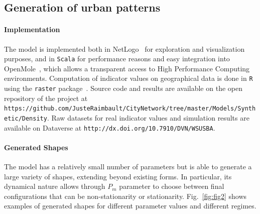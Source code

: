 \documentclass[10pt,letterpaper,draft]{article}
\begin{document}
\subsection*{Generation of urban patterns}


\paragraph{Implementation}


The model is implemented both in NetLogo~\cite{wilensky1999netlogo} for exploration and visualization purposes, and in \texttt{Scala} for performance reasons and easy integration into OpenMole~\cite{reuillon2013openmole}, which allows a transparent access to High Performance Computing environments. Computation of indicator values on geographical data is done in \texttt{R} using the \texttt{raster} package~\cite{hijmans2015geographic}. Source code and results are available on the open repository of the project at \texttt{https://github.com/JusteRaimbault/CityNetwork/tree/master/Models/Synthetic/Density}. Raw datasets for real indicator values and simulation results are available on Dataverse at \texttt{http://dx.doi.org/10.7910/DVN/WSUSBA}.



\paragraph{Generated Shapes}

The model has a relatively small number of parameters but is able to generate a large variety of shapes, extending beyond existing forms. In particular, its dynamical nature allows through $P_m$ parameter to choose between final configurations that can be non-stationarity or stationarity. Fig.~\ref{fig:fig2} shows examples of generated shapes for different parameter values and different regimes.
\end{document}
